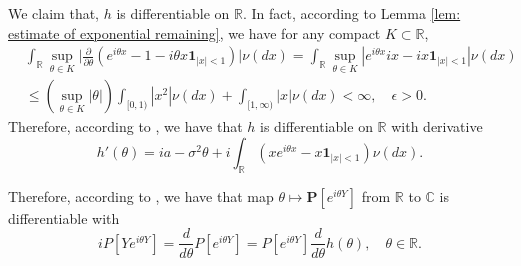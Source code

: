 \documentclass[12pt, a4paper]{amsart}
\theoremstyle{definition}
\numberwithin{equation}{section}
\begin{document}
	We claim that, $h$ is differentiable on $\mathbb R$.
	In fact, according to Lemma \ref{lem: estimate of exponential remaining}, we have for any compact $K \subset \mathbb R$,
\begin{align}
	&\int_{\mathbb R} \sup_{\theta \in K} \Big|\frac{\partial}{\partial \theta}(e^{i\theta x} - 1 - i \theta x\mathbf 1_{|x|< 1})\Big| \nu(dx) 
    = \int_{\mathbb R} \sup_{\theta \in K} | e^{
    i\theta x} ix - ix \mathbf 1_{|x|< 1} | \nu(dx)
    \\&\leq(\sup_{\theta \in K}|\theta|) \int_{[0,1)}|x^2| \nu(dx)+\int_{[1,\infty)} |x|  \nu(dx)
    < \infty,
    \quad \epsilon > 0.
\end{align}
	Therefore, according to \cite[Theorem A.5.2.]{Durrett2010Probability},
	we have that $h$ is differentiable on $\mathbb R$ with derivative
\begin{equation}
	h'(\theta) = ia - \sigma^2 \theta + i \int_{\mathbb R} (xe^{i\theta x} - x\mathbf 1_{|x|<1}) \nu(dx).
\end{equation}
	
	Therefore, according to \cite[Theorem 3.2.4.]{Cuppens1975Decomposition}, we have that map $\theta \mapsto \mathbf P[e^{i\theta Y}]$ from $\mathbb R$ to $\mathbb C$ is differentiable with
\begin{equation}
\label{eq: derivative of characteristic exponent}
	iP[Y e^{i\theta Y}]
	=\frac{d}{d \theta} P[e^{i\theta Y}] 
	= P[e^{i\theta Y}] \frac{d}{d \theta} h(\theta),
	\quad \theta \in \mathbb R.
\end{equation}
\end{document}
